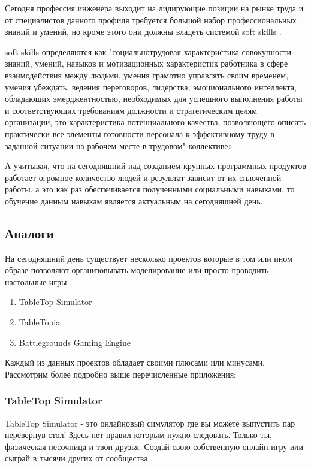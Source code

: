 	Сегодня профессия инженера выходит на лидирующие позиции на рынке труда и от специалистов данного профиля требуется большой набор профессиональных знаний и умений, но кроме этого они должны владеть системой soft skills \cite{5}.
	
	soft skills определяются  как "социальнотрудовая характеристика совокупности знаний, умений, навыков и мотивационных	характеристик работника в сфере взаимодействия между людьми, умения грамотно управлять своим временем, умения убеждать, ведения переговоров, лидерства, эмоционального интеллекта, обладающих эмерджентностью, необходимых для успешного выполнения работы и соответствующих требованиям должности и стратегическим целям организации, это характеристика потенциального качества, позволяющего описать практически все элементы готовности персонала к эффективному труду в заданной ситуации на рабочем месте в трудовом" \cite{5}
	коллективе»
	
	А учитывая, что на сегодняшний над созданием крупных программных продуктов работает огромное количество людей и результат зависит от их сплоченной работы, а это как раз обеспечивается полученными социальными навыками, то обучение данным навыкам является актуальным на сегодняшней день.
	
\subsection{Аналоги}

	На сегодняшний день существует несколько проектов которые в том или ином образе позволяют организовывать моделирование или просто проводить настольные игры \cite{2}.
	\begin{enumerate}
		\item TableTop Simulator
		\item TableTopia
		\item Battlegrounds Gaming Engine
	\end{enumerate}

	Каждый из данных проектов обладает своими плюсами или минусами. Рассмотрим более подробно выше перечисленные приложения:
	
	\subsubsection{TableTop Simulator}
	
	TableTop Simulator - это онлайновый симулятор где вы можете выпустить пар перевернув стол! Здесь нет правил которым нужно следовать. Только ты, физическая песочница и твои друзья. Создай свою собственную онлайн игру или сыграй в тысячи других от сообщества \cite{3}.
	
